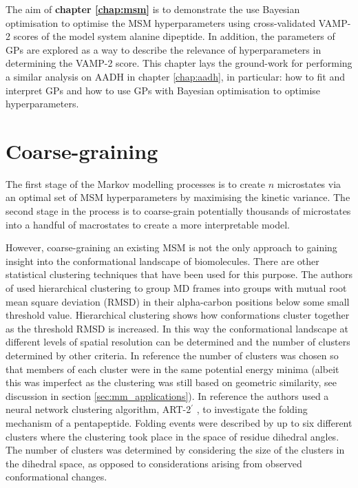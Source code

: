 The aim of \textbf{chapter \ref{chap:msm}} is to demonstrate the use Bayesian optimisation to optimise the MSM hyperparameters using cross-validated VAMP-2 scores of the model system alanine dipeptide. In addition, the parameters of GPs are explored as a way to describe the relevance of hyperparameters in determining the VAMP-2 score. This chapter lays the ground-work for performing a similar analysis on AADH in chapter \ref{chap:aadh}, in particular: how to fit and interpret GPs and how to use GPs with Bayesian optimisation to optimise hyperparameters. 

\section{Coarse-graining}\label{sec:intro_coarse}

The first stage of the Markov modelling processes is to create $n$ microstates via an optimal set of MSM hyperparameters by maximising the kinetic variance. The second  stage in the process is to coarse-grain potentially thousands of microstates into a handful of macrostates to create a more interpretable model. 

However, coarse-graining an existing MSM is not the only approach to gaining insight into the conformational landscape of biomolecules.  There are other statistical clustering techniques that have been used for this purpose. The authors of \cite{troyerProteinConformationalLandscapes1995} used hierarchical clustering \cite[chapter 10]{friedman2001elements} to group MD frames into groups with mutual root mean square deviation (RMSD) in their alpha-carbon positions below some small threshold value. Hierarchical clustering shows how conformations cluster together as the threshold RMSD is increased.  In this way the conformational landscape at different levels of spatial resolution can be determined and the number of clusters determined by other criteria. In reference \cite{troyerProteinConformationalLandscapes1995} the number of clusters was chosen so that members of each cluster were in the same potential energy minima (albeit this was imperfect as the clustering was still based on geometric similarity, see discussion in section \ref{sec:mm_applications}).  In reference \cite{karpen1993statistical} the authors used a neural network clustering algorithm, ART-2$^{\prime}$ \cite{carpenterARTSelforganizationStable1987}, to investigate the folding mechanism of a pentapeptide. Folding events were described by up to six different clusters where the clustering took place in the space of residue dihedral angles. The number of clusters was determined by considering the size of the clusters in the dihedral space, as opposed to considerations arising from observed conformational changes. 

